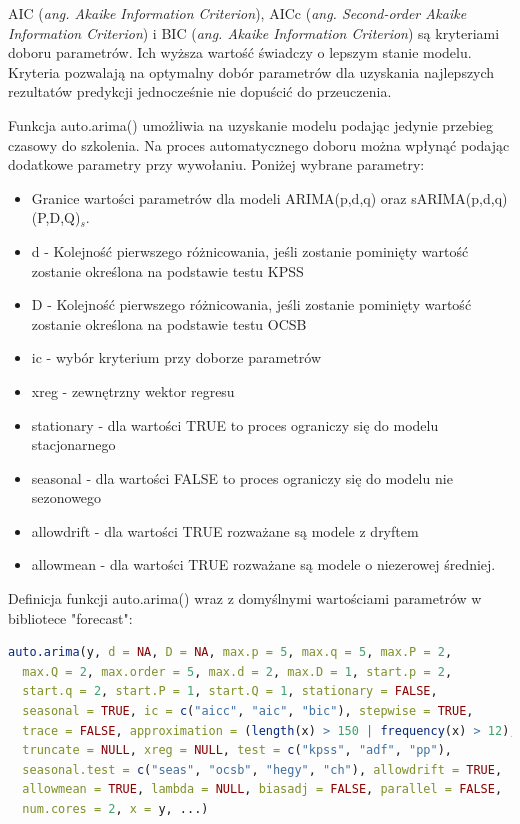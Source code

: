 \documentclass[11pt]{report}
\begin{document}
AIC (\textit{ang. Akaike Information Criterion}), AICc (\textit{ang. Second-order Akaike Information Criterion}) i BIC (\textit{ang. Akaike Information Criterion}) są kryteriami doboru parametrów. Ich wyższa wartość świadczy o lepszym stanie modelu. Kryteria pozwalają na optymalny dobór parametrów dla uzyskania najlepszych rezultatów predykcji jednocześnie nie dopuścić do przeuczenia.

Funkcja auto.arima() umożliwia na uzyskanie modelu podając jedynie przebieg czasowy do szkolenia. 
Na proces automatycznego doboru można wpłynąć podając dodatkowe parametry przy wywołaniu. Poniżej wybrane parametry:
\begin{itemize}
\item Granice wartości parametrów dla modeli ARIMA(p,d,q) oraz sARIMA(p,d,q)(P,D,Q)$_s$.  
\item d - Kolejność pierwszego różnicowania, jeśli zostanie pominięty wartość zostanie określona na podstawie testu KPSS
\item D - Kolejność pierwszego różnicowania, jeśli zostanie pominięty wartość zostanie określona na podstawie testu OCSB
\item ic - wybór kryterium przy doborze parametrów
\item xreg - zewnętrzny wektor regresu
\item stationary - dla wartości TRUE to proces ograniczy się do modelu stacjonarnego
\item seasonal - dla wartości FALSE to proces ograniczy się do modelu nie sezonowego
\item allowdrift - dla wartości TRUE rozważane są modele z dryftem
\item allowmean - dla wartości TRUE rozważane są modele o niezerowej średniej.
\end{itemize}

Definicja funkcji auto.arima() wraz z domyślnymi wartościami parametrów w bibliotece "forecast":
\begin{lstlisting}[language=R]
auto.arima(y, d = NA, D = NA, max.p = 5, max.q = 5, max.P = 2,
  max.Q = 2, max.order = 5, max.d = 2, max.D = 1, start.p = 2,
  start.q = 2, start.P = 1, start.Q = 1, stationary = FALSE,
  seasonal = TRUE, ic = c("aicc", "aic", "bic"), stepwise = TRUE,
  trace = FALSE, approximation = (length(x) > 150 | frequency(x) > 12),
  truncate = NULL, xreg = NULL, test = c("kpss", "adf", "pp"),
  seasonal.test = c("seas", "ocsb", "hegy", "ch"), allowdrift = TRUE,
  allowmean = TRUE, lambda = NULL, biasadj = FALSE, parallel = FALSE,
  num.cores = 2, x = y, ...)
\end{lstlisting}
\end{document}
